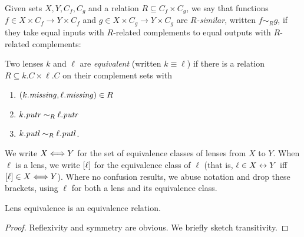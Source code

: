 \iffull
\begin{defn}[$R$-similarity]
\else
\begin{defn}
\fi
Given \iffull sets \fi $X,Y,C_f,C_g$ and a relation $R \subseteq C_f \times C_g$,
we say that functions 
$f \in X \times C_f \to Y \times C_f$ and $g \in X \times C_g \to Y \times C_g$
are {\em $R$-similar}, written $f \sim_R g$, if they take equal inputs with $R$-related
complements to equal outputs with $R$-related complements:
\end{defn}

\begin{defn}
Two lenses $k$ and $\ell$ are {\em equivalent} (written $k \equiv \ell$) if
there is a relation $R \subseteq k.C \times \ell.C$ \iffull on their complement
sets \fi with
\begin{enumerate}
    \item $(k.\mathit{missing}, \ell.\mathit{missing}) \in R$
    \item $k.\mathit{putr} \sim_R \ell.\mathit{putr}$
    \item $k.\mathit{putl} \sim_R \ell.\mathit{putl}$.
\end{enumerate}
We write $X \Longleftrightarrow Y$ for the set of equivalence classes of lenses from $X$
to $Y$.  When $\ell$ is a lens, we write $[\ell]$ for the
equivalence class of $\ell$ (that is, $\ell \in X\leftrightarrow Y$ iff
$[\ell] \in X\Longleftrightarrow Y$).  Where no confusion results, we 
abuse notation and drop these brackets, using $\ell$ for both a lens and
its equivalence class.
\end{defn}

\iffull
\begin{lemma}
Lens equivalence is an equivalence relation.
\end{lemma}
\begin{proof}
Reflexivity and symmetry are obvious. We briefly sketch transitivity.


\end{proof}
\end{defn}
